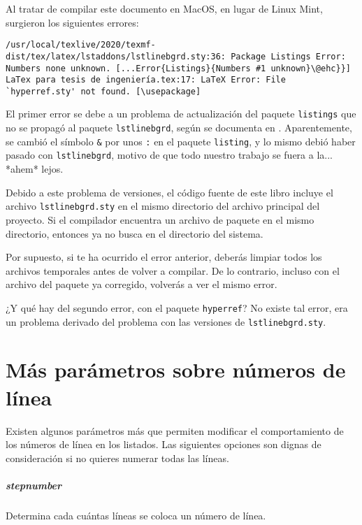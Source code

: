 Al tratar de compilar este documento en MacOS, en lugar de Linux Mint, surgieron los siguientes errores:

\begin{lstlisting}[style=errores]
/usr/local/texlive/2020/texmf-dist/tex/latex/lstaddons/lstlinebgrd.sty:36: Package Listings Error: Numbers none unknown. [...Error{Listings}{Numbers #1 unknown}\@ehc}}]
LaTex para tesis de ingeniería.tex:17: LaTeX Error: File `hyperref.sty' not found. [\usepackage]
\end{lstlisting}

El primer error  se debe a un problema de actualización del paquete \texttt{listings} que no se propagó al paquete \texttt{lstlinebgrd}, según se documenta en \cite{bib:error_lstlinebgrd}. Aparentemente, se cambió el símbolo \texttt{\&} por unos \texttt{:} en el paquete \texttt{listing}, y lo mismo debió haber pasado con \texttt{lstlinebgrd}, motivo de que todo nuestro trabajo se fuera a la... *ahem* lejos.

Debido a este problema de versiones, el código fuente de este libro incluye el archivo \texttt{lstlinebgrd.sty} en el mismo directorio del archivo principal del proyecto. Si el compilador encuentra un archivo de paquete en el mismo directorio, entonces ya no busca en el directorio del sistema.

Por supuesto, si te ha ocurrido el error anterior, deberás limpiar todos los archivos temporales antes de volver a compilar. De lo contrario, incluso con el archivo del paquete ya corregido, volverás a ver el mismo error.

¿Y qué hay del segundo error, con el paquete \texttt{hyperref}? No existe tal error, era un problema derivado del problema con las versiones de \texttt{lstlinebgrd.sty}.



\section{Más parámetros sobre números de línea}
\label{sec:mas_parametros_sobre_numeros_de_linea}



Existen algunos parámetros más que permiten modificar el comportamiento de los números de línea en los listados. Las siguientes opciones son dignas de consideración si no quieres numerar todas las líneas.

\subparagraph{stepnumber} Determina cada cuántas líneas se coloca un número de línea.

